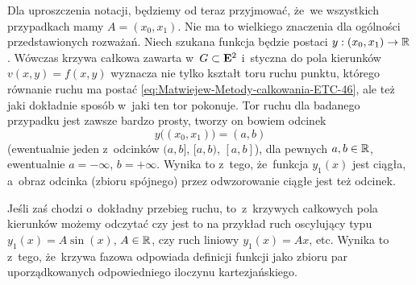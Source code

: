 \documentclass[a4paper,11pt]{article}
\numberwithin{equation}{section}
\begin{document}
Dla uproszczenia notacji, będziemy od teraz przyjmować, że~we wszystkich
przypadkach mamy $A = ( x_{ 0 }, x_{ 1 } )$. Nie ma to wielkiego znaczenia
dla ogólności przedstawionych rozważań. Niech szukana funkcja będzie postaci
$y : ( x_{ 0 }, x_{ 1 } ) \to \mathbb{R}$. Wówczas krzywa całkowa
zawarta w~$G \subset \mathbf{E}^{ 2 }$ i~styczna do pola kierunków
$v( x, y ) = f( x, y )$ wyznacza nie tylko kształt toru ruchu punktu,
którego równanie ruchu ma postać
\eqref{eq:Matwiejew-Metody-calkowania-ETC-46},
ale też jaki dokładnie sposób w~jaki ten tor pokonuje. Tor ruchu dla
badanego przypadku jest zawsze bardzo prosty, tworzy on bowiem odcinek
\begin{equation}
  \label{eq:Matwiejew-Metody-calkowania-ETC-48}
  y\big( ( x_{ 0 }, x_{ 1 } ) \big) = ( a, b )
\end{equation}
 (ewentualnie jeden z~odcinków
$( a, b ]$, $[ a, b )$, $[ a, b ]$), dla pewnych $a, b \in \mathbb{R}$,
ewentualnie $a = -\infty$, $b = +\infty$. Wynika to z~tego, że~funkcja $y_{ 1 }( x )$
jest ciągła, a~obraz odcinka (zbioru spójnego) przez odwzorowanie ciągłe
jest też odcinek.

Jeśli zaś chodzi o~dokładny przebieg ruchu, to~z~krzywych całkowych pola
kierunków możemy odczytać czy jest to na przykład ruch oscylujący typu
$y_{ 1 }( x ) = A \sin( x )$, $A \in \mathbb{R}$, czy ruch liniowy
$y_{ 1 }( x ) = A x$, etc. Wynika to z~tego, że~krzywa fazowa odpowiada
definicji funkcji jako zbioru par uporządkowanych odpowiedniego iloczynu
kartezjańskiego.
\end{document}
